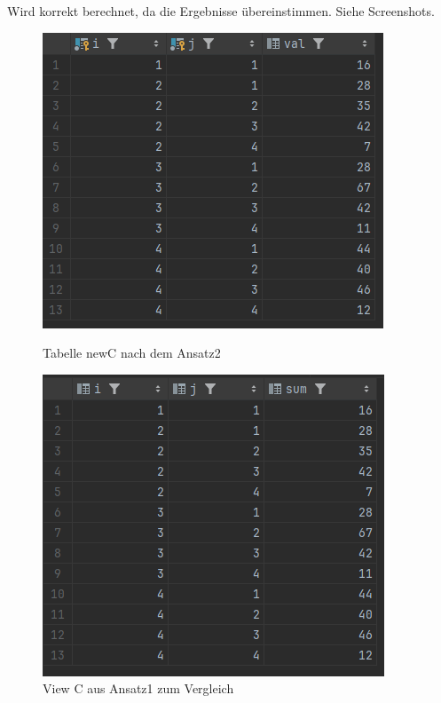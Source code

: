 \documentclass[11pt]{scrartcl}
\begin{document}
Wird korrekt berechnet, da die Ergebnisse übereinstimmen. Siehe Screenshots.
\begin{figure}[H]
  \begin{minipage}[b]{.4\linewidth}
    \begin{center}
      \includegraphics[width=\linewidth]{Tabelle_new_c.png}
      \caption{Tabelle newC nach dem Ansatz2}
    \end{center}
  \end{minipage}
  \hspace{.1\linewidth}
  \begin{minipage}[b]{.4\linewidth}
    \begin{center}
      \includegraphics[width=\linewidth]{View_C_im_Vergleich.png}
      \caption{View C aus Ansatz1 zum Vergleich}
    \end{center}
  \end{minipage}
\end{figure}
\end{document}
